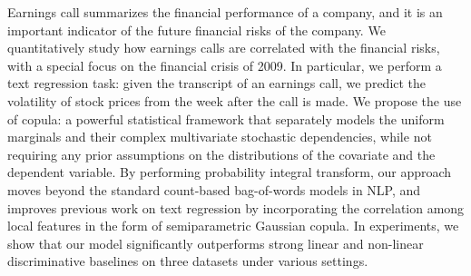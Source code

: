 Earnings call summarizes the financial performance of a company, and it is an important indicator of the future financial risks of the company. We quantitatively study how earnings calls are correlated with the financial risks, with a special focus on the financial crisis of 2009. In particular, we perform a text regression task: given the transcript of an earnings call, we predict the volatility of stock prices from the week after the call is made. We propose the use of copula: a powerful statistical framework that separately models the uniform marginals and their complex multivariate stochastic dependencies, while not requiring any prior assumptions on the distributions of the covariate and the dependent variable. By performing probability integral transform, our approach moves beyond the standard count-based bag-of-words models in NLP, and improves previous work on text regression by incorporating the correlation among local features in the form of semiparametric Gaussian copula. In experiments, we show that our model significantly outperforms strong linear and non-linear discriminative baselines on three datasets under various settings.

